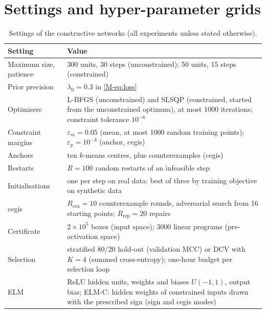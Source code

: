 \documentclass[11pt,a4paper]{article}
\begin{document}
\section{Settings and hyper-parameter grids}\label{sup:settings}
\begin{table}[H]\centering\small
\caption{Settings of the constructive networks (all experiments unless stated otherwise).}\label{tab:settings}
\begin{tabular}{@{}lp{}@{}}\toprule
Setting & Value \\\midrule
Maximum size, patience & 300 units, 30 steps (unconstrained); 50 units, 15 steps (constrained) \\
Prior precision & $\lambda_0=0.3$ in \eqref{M-eq:loss} \\
Optimisers & L-BFGS (unconstrained) and SLSQP (constrained, started from the unconstrained optimum), at most 1000 iterations; constraint tolerance $10^{-6}$ \\
Constraint margins & $\varepsilon_m=0.05$ (mean, at most 1000 random training points); $\varepsilon_p=10^{-3}$ (anchor, cegis) \\
Anchors & ten $k$-means centres, plus counterexamples (cegis) \\
Restarts & $R=100$ random restarts of an infeasible step \\
Initialisations & one per step on real data; best of three by training objective on synthetic data \\
cegis & $R_{\mathrm{cex}}=10$ counterexample rounds, adversarial search from 16 starting points; $R_{\mathrm{rep}}=20$ repairs \\
Certificate & $2\times10^5$ boxes (input space); 3000 linear programs (pre-activation space) \\
Selection & stratified 80/20 hold-out (validation MCC) or DCV with $K=4$ (summed cross-entropy); one-hour budget per selection loop \\
ELM & ReLU hidden units, weights and biases $U(-1,1)$, output bias; ELM-C: hidden weights of constrained inputs drawn with the prescribed sign (sign and cegis modes) \\
\bottomrule\end{tabular}
\end{table}
\end{document}
